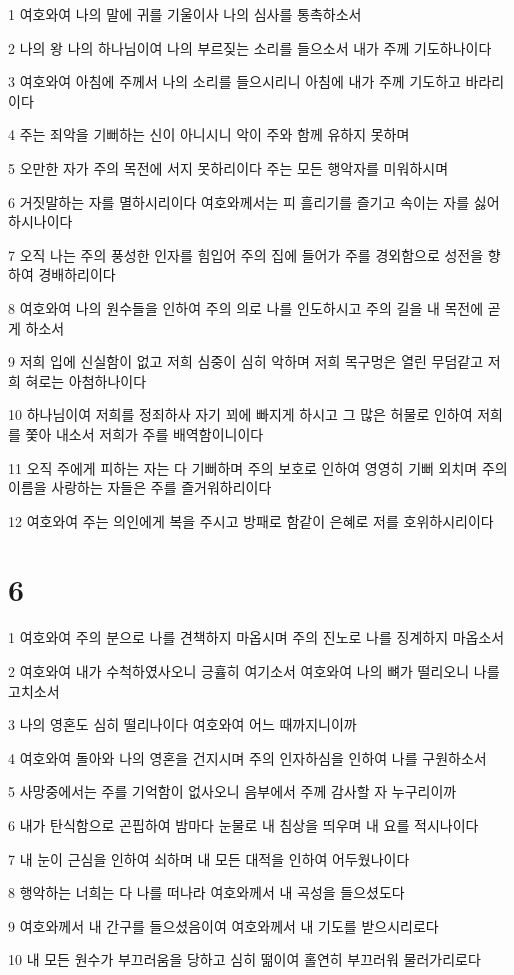 \par 1 여호와여 나의 말에 귀를 기울이사 나의 심사를 통촉하소서
\par 2 나의 왕 나의 하나님이여 나의 부르짖는 소리를 들으소서 내가 주께 기도하나이다
\par 3 여호와여 아침에 주께서 나의 소리를 들으시리니 아침에 내가 주께 기도하고 바라리이다
\par 4 주는 죄악을 기뻐하는 신이 아니시니 악이 주와 함께 유하지 못하며
\par 5 오만한 자가 주의 목전에 서지 못하리이다 주는 모든 행악자를 미워하시며
\par 6 거짓말하는 자를 멸하시리이다 여호와께서는 피 흘리기를 즐기고 속이는 자를 싫어하시나이다
\par 7 오직 나는 주의 풍성한 인자를 힘입어 주의 집에 들어가 주를 경외함으로 성전을 향하여 경배하리이다
\par 8 여호와여 나의 원수들을 인하여 주의 의로 나를 인도하시고 주의 길을 내 목전에 곧게 하소서
\par 9 저희 입에 신실함이 없고 저희 심중이 심히 악하며 저희 목구멍은 열린 무덤같고 저희 혀로는 아첨하나이다
\par 10 하나님이여 저희를 정죄하사 자기 꾀에 빠지게 하시고 그 많은 허물로 인하여 저희를 쫓아 내소서 저희가 주를 배역함이니이다
\par 11 오직 주에게 피하는 자는 다 기뻐하며 주의 보호로 인하여 영영히 기뻐 외치며 주의 이름을 사랑하는 자들은 주를 즐거워하리이다
\par 12 여호와여 주는 의인에게 복을 주시고 방패로 함같이 은혜로 저를 호위하시리이다

\chapter{6}

\par 1 여호와여 주의 분으로 나를 견책하지 마옵시며 주의 진노로 나를 징계하지 마옵소서
\par 2 여호와여 내가 수척하였사오니 긍휼히 여기소서 여호와여 나의 뼈가 떨리오니 나를 고치소서
\par 3 나의 영혼도 심히 떨리나이다 여호와여 어느 때까지니이까
\par 4 여호와여 돌아와 나의 영혼을 건지시며 주의 인자하심을 인하여 나를 구원하소서
\par 5 사망중에서는 주를 기억함이 없사오니 음부에서 주께 감사할 자 누구리이까
\par 6 내가 탄식함으로 곤핍하여 밤마다 눈물로 내 침상을 띄우며 내 요를 적시나이다
\par 7 내 눈이 근심을 인하여 쇠하며 내 모든 대적을 인하여 어두웠나이다
\par 8 행악하는 너희는 다 나를 떠나라 여호와께서 내 곡성을 들으셨도다
\par 9 여호와께서 내 간구를 들으셨음이여 여호와께서 내 기도를 받으시리로다
\par 10 내 모든 원수가 부끄러움을 당하고 심히 떪이여 홀연히 부끄러워 물러가리로다

